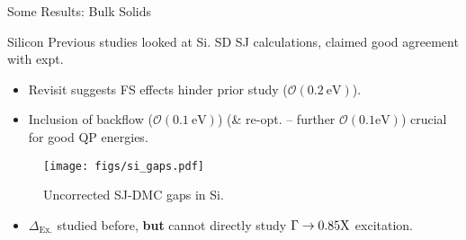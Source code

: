 \documentclass[10pt, pdf, hyperref={draft}, usenames, dvipsnames]{beamer}
\begin{document}
\begin{frame}{Some Results: Bulk Solids}

\begin{minipage}[t]{0.45\textwidth}

\begin{block}{Silicon}
  Previous studies looked at Si. SD SJ calculations, claimed good
  agreement with expt.\footnotemark \\
  \begin{itemize}
    \item Revisit suggests FS effects hinder prior study ($\mathcal{O}(0.2\
    \text{eV})$).
    \item Inclusion of backflow ($\mathcal{O}(0.1\ \text{eV})$) (\& re-opt. --
    further $\mathcal{O}(0.1 \text{eV})$) crucial for good QP energies.
  \end{itemize}
\end{block}

\end{minipage}%
\hfill
\begin{minipage}[t]{0.50\textwidth}

\begin{figure}[H]
  \centering
  \texttt{[image: figs/si\_gaps.pdf]}
  \caption{Uncorrected SJ-DMC gaps in Si.}
\label{fig:si_gaps}
\end{figure}

\end{minipage}%

\begin{itemize}
  \item $\Delta_{\text{Ex.}}$ studied before, \textbf{but} cannot directly
  study $\Gamma \rightarrow 0.85{\rm X}$ excitation.
\end{itemize}


\end{frame}
\end{document}
